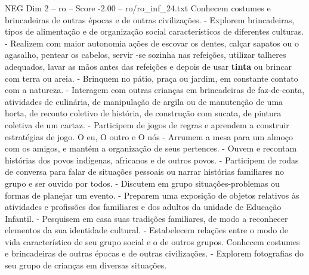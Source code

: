 \begin{textsample}{NEG Dim 2 – ro – Score -2.00 – ro/ro\_inf\_24.txt}
Conhecem costumes e brincadeiras de outras épocas e de outras civilizações. - Explorem brincadeiras, tipos de alimentação e de organização social característicos de diferentes culturas. - Realizem com maior autonomia ações de escovar os dentes, calçar sapatos ou o agasalho, pentear os cabelos, servir -se sozinha nas refeições, utilizar talheres adequados, lavar as mãos antes das refeições e depois de usar \textbf{tinta} ou brincar com terra ou areia. - Brinquem no pátio, praça ou jardim, em constante contato com a natureza. - Interagem com outras crianças em brincadeiras de faz-de-conta, atividades de culinária, de manipulação de argila ou de manutenção de uma horta, de reconto coletivo de história, de construção com sucata, de pintura coletiva de um cartaz. - Participem de jogos de regras e aprendem a construir estratégias de jogo.
O eu, O outro e O nós - Arrumem a mesa para um almoço com os amigos, e mantém a organização de seus pertences. - Ouvem e recontam histórias dos povos indígenas, africanos e de outros povos. - Participem de rodas de conversa para falar de situações pessoais ou narrar histórias familiares no grupo e ser ouvido por todos. - Discutem em grupo situações-problemas ou formas de planejar um evento. - Preparem uma exposição de objetos relativos às atividades e profissões dos familiares e dos adultos da unidade de Educação Infantil. - Pesquisem em casa suas tradições familiares, de modo a reconhecer elementos da sua identidade cultural. - Estabelecem relações entre o modo de vida característico de seu grupo social e o de outros grupos.
Conhecem costumes e brincadeiras de outras épocas e de outras civilizações. - Explorem fotografias do seu grupo de crianças em diversas situações.

\end{textsample}
